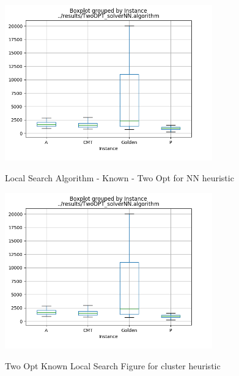 \documentclass[12pt]{article}
\begin{document}
\begin{appendices}
\begin{figure}[!htb]
	\centering
	\caption{Local Search Algorithm - Known - Two Opt for NN heuristic}{\includegraphics[width=0.8\textwidth]{TwoOPT_solverNN_algorithm_boxplot.png}\label{fig:two_opt_nn}}
\end{figure}
\begin{figure}[!htb]
	\centering
	\caption{Two Opt Known Local Search Figure for cluster heuristic}{\includegraphics[width=0.8\textwidth]{TwoOPT_solverNN_algorithm_boxplot.png}\label{fig:two_opt_cluster}}
\end{figure}

\end{appendices}
\end{document}
